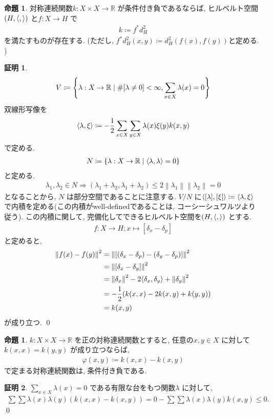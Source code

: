 \documentclass[10pt, fleqn, label-section=none]{bxjsarticle}
\theoremstyle{definition}
\newtheorem{prop}[dfn]{命題}
\newtheorem*{pf*}{証明}
\newcommand{\paren}[1]{\mleft( #1\mright )}
\newcommand{\cbra}[1]{\mleft\{#1\mright\}}
\newcommand{\tbra}[1]{\mleft\langle#1\mright\rangle}
\newcommand{\norm}[1]{\left\|#1\right\|}
\newcommand{\naraba}{\Rightarrow}
\renewcommand{\;}{\, ; \,}
\begin{document}
\begin{prop}対称連続関数$k: X \times X \rightarrow \mathbb R$ が条件付き負であるならば, ヒルベルト空間$(H, \tbra{, })$ と$f: X \rightarrow H$ で 
\begin{align*} k \coloneqq f^*d^2_H \end{align*}
を満たすものが存在する. (ただし, $f^*d^2_H(x, y) \coloneqq d^2_H(f(x), f(y))$と定める. )
\end{prop}
\begin{pf*}
\begin{align*} V \coloneqq \cbra{ \lambda: X \rightarrow \mathbb R \mid \# [\lambda \neq 0] < \infty, \sum_{x \in X} \lambda(x) = 0 } \end{align*}
双線形写像を
\begin{align*} \tbra{\lambda, \xi} \coloneqq - \frac{1}{2} \sum_{x \in X}\sum_{y \in X} \lambda(x)\xi(y) k (x, y)   \end{align*}
で定める. 
\begin{align*} N \coloneqq \cbra{\lambda : X \rightarrow \mathbb R  \mid  \tbra{\lambda, \lambda} = 0 } \end{align*}
と定める. 
\begin{align*} \lambda_1, \lambda_2 \in N \naraba (\lambda_1 + \lambda_2, \lambda_1 + \lambda_2) \leq 2 \norm{\lambda_1} \norm{\lambda_2} = 0  \end{align*}
となることから, $N$ は部分空間であることに注意する. 
 $V / N $ に$ \tbra{[\lambda], [\xi] } \coloneqq \tbra{\lambda, \xi}$ で内積を定める(この内積がwell-definedであることは, コーシーシュワルツより従う). この内積に関して, 完備化してできるヒルベルト空間を$(H, \tbra{, })$ とする. 
\begin{align*} f: X \rightarrow H; x \mapsto [\delta_x - \delta_{p}]\end{align*}
と定めると, 
\begin{align*} \norm{f(x) - f(y)}^2 &= \norm{[ (\delta_x - \delta_{p}) -   (\delta_y - \delta_{p})    ]}^2 \\&= \norm{ [\delta_x - \delta_y]  }^2 \\&= \norm{\delta_x}^2 - 2\tbra{\delta_x, \delta_y} + \norm{\delta_y} ^2  \\&= -\frac{1}{2} \paren{k (x,x) - 2 k (x,y) + k (y,y)} \\&= k (x, y) \end{align*}
が成り立つ. 
\qed
\end{pf*}


\begin{prop}$k : X \times X \rightarrow \mathbb R$ を正の対称連続関数とすると, 任意の$x, y \in X$ に対して$k(x,x) = k(y, y)$ が成り立つならば, 
\begin{align*} \varphi(x, y) \coloneqq k(x, x) - k(x, y)    \end{align*}
で定まる対称連続関数は, 条件付き負である. 
\end{prop}
\begin{pf*}$\sum_{x \in X} \lambda(x) = 0$ である有限な台をもつ関数$\lambda$  に対して, 
\begin{align*} \sum \sum \lambda (x) \lambda (y) (k(x, x) - k(x, y)  ) =  0 - \sum \sum \lambda (x) \lambda (y)k(x, y) \leq 0 . \end{align*}
\qed
\end{pf*}
\end{document}
